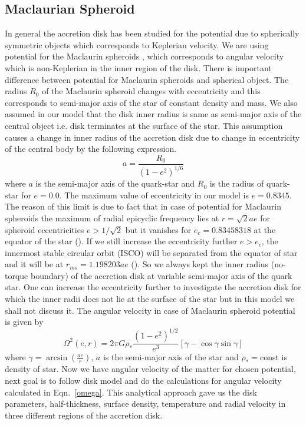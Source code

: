 \documentclass[useAMS,usenatbib]{mn2e}
\begin{document}
\subsection{Maclaurian Spheroid}
In general the accretion disk has been studied for the potential due to spherically symmetric objects which corresponds to Keplerian velocity. We are using potential for the Maclaurin spheroids \citet{2013MNRAS.434.2825K}, \citet{2002A&A...381L..21A} which corresponds to angular velocity which is non-Keplerian in the inner region of the disk. There is important difference between potential for Maclaurin spheroids and spherical object. The radius $R_0$ of the Maclaurin spheroid changes with eccentricity and this corresponds to semi-major axis of the star of constant density and mass. We also assumed in our model that the disk inner radius is same as semi-major axis of the central object i.e. disk terminates at the surface of the star. This assumption causes a change in inner radius of the accretion disk due to change in eccentricity of the central body by the following expression.
\begin{equation}
a = \frac{R_0}{(1 - e^2)^{1/6}}
\end{equation}
where $a$ is the semi-major axis of the quark-star and $R_0$ is the radius of quark-star for $e = 0.0$. The maximum value of eccentricity in our model is $e = 0.8345$. The reason of this limit is due to fact that in case of potential for Maclaurin spheroids the maximum of radial epicyclic frequency lies at $r = \sqrt{2}ae$ for spheroid eccentricities $e>1/\sqrt{2}$ but it vanishes for $e_c = 0.83458318$ at the equator of the star (\citet{2013MNRAS.434.2825K}). If we still increase the eccentricity further $e>e_c$, the innermost stable circular orbit (ISCO) will be separated from the equator of star and it will be at $r_{ms} = 1.198203ae$ (\citet{2013MNRAS.434.2825K}). So we always kept the inner radius (no-torque boundary) of the accretion disk at variable semi-major axis of the quark star. One can increase the eccentricity further to investigate the accretion disk for which the inner radii does not lie at the surface of the star but in this model we shall not discuss it. The angular velocity in case of Maclaurin spheroid potential is given by
\begin{equation}
\Omega ^2 \left(e,r\right)= 2\pi G\rho_* \frac{(1-e^2)^{1/2}}{e^3}\left[\gamma - \cos \gamma \sin\gamma \right]
\label{omega}
\end{equation}  
where $\gamma = \arcsin (\frac{a e}{r})$, $a$ is the semi-major axis of the star and $\rho_* =$const is density of star. Now we have angular velocity of the matter for chosen potential, next goal is to follow \citet{1973A&A....24..337S} disk model and do the calculations for angular velocity calculated in Eqn.~\ref{omega}. This analytical approach gave us the disk parameters, half-thickness, surface density, temperature and radial velocity in three different regions of the accretion disk.
\end{document}
